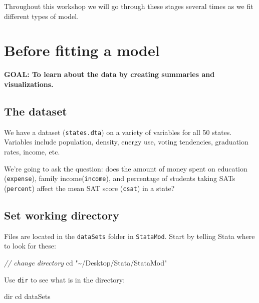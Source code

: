 \documentclass[
]{book}
\newenvironment{Shaded}{\begin{snugshade}}{\end{snugshade}}
\newcommand{\CommentTok}[1]{\textcolor[rgb]{0.56,0.35,0.01}{\textit{#1}}}
\newcommand{\NormalTok}[1]{#1}
\newcommand{\OtherTok}[1]{\textcolor[rgb]{0.56,0.35,0.01}{#1}}
\newcommand{\StringTok}[1]{\textcolor[rgb]{0.31,0.60,0.02}{#1}}
\begin{document}
Throughout this workshop we will go through these stages several times as we fit different types of model.

\hypertarget{before-fitting-a-model-1}{%
\section{Before fitting a model}\label{before-fitting-a-model-1}}

\textbf{GOAL: To learn about the data by creating summaries and visualizations.}

\hypertarget{the-dataset}{%
\subsection{The dataset}\label{the-dataset}}

We have a dataset (\texttt{states.dta}) on a variety of variables for all 50 states. Variables include population, density, energy use, voting tendencies, graduation rates, income, etc.

We're going to ask the question: does the amount of money spent on education (\texttt{expense}), family income(\texttt{income}), and percentage of students taking SATs (\texttt{percent}) affect the mean SAT score (\texttt{csat}) in a state?

\hypertarget{set-working-directory}{%
\subsection{Set working directory}\label{set-working-directory}}

Files are located in the \texttt{dataSets} folder in \texttt{StataMod}. Start by telling Stata where to look for these:

\begin{Shaded}
\begin{Highlighting}[]
\CommentTok{// change directory}
\NormalTok{cd }\StringTok{"\textasciitilde{}/Desktop/Stata/StataMod"}
\end{Highlighting}
\end{Shaded}

Use \texttt{dir} to see what is in the directory:

\begin{Shaded}
\begin{Highlighting}[]
\OtherTok{dir}
\NormalTok{cd dataSets}
\end{Highlighting}
\end{Shaded}
\end{document}
